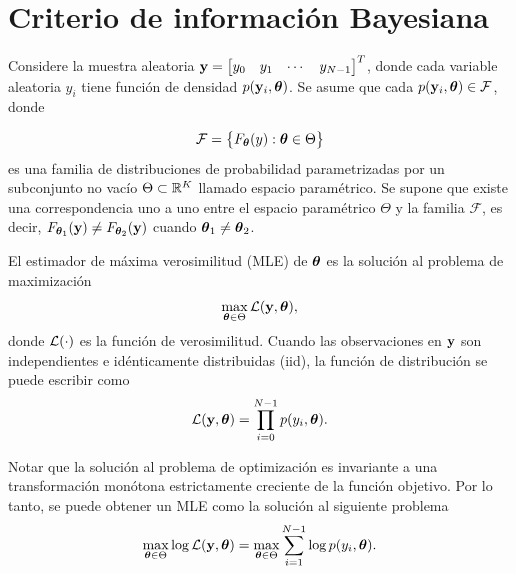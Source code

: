
\section{Criterio de información Bayesiana}\label{BIC_Appendix}


Considere la muestra aleatoria $\mathbf{y}=\begin{bmatrix} y_0 & y_1 & \cdots & y_{N-1}
\end{bmatrix}^T$, donde cada variable aleatoria $y_i$ tiene función de densidad $p(\mathbf{y}_i,\boldsymbol{\theta})$. Se asume que cada $p(\mathbf{y}_i,\boldsymbol{\theta})\in\mathcal{F}$, donde

\begin{equation}
	\mathcal{F} = \big\{F_{\boldsymbol{\theta}}(y):\boldsymbol{\theta}\in\Theta\big\}
	\label{eq:MLE0}
\end{equation}
es una familia de distribuciones de probabilidad parametrizadas por un  subconjunto no vacío $\Theta\subset\mathbb{R}^K$ llamado espacio paramétrico. Se supone que existe una correspondencia uno a uno entre el espacio paramétrico $\Theta$ y la familia $\mathcal{F}$, es decir, $F_{\boldsymbol{\theta}_1}(\mathbf{y})\neq F_{\boldsymbol{\theta}_2}(\mathbf{y})$ cuando $\boldsymbol{\theta}_1\neq\boldsymbol{\theta}_2$.

El estimador de máxima verosimilitud (MLE) de $\boldsymbol{\theta}$ es la solución al problema de maximización 
\begin{equation}
	\max_{\boldsymbol{\theta}\in\Theta}\mathcal{L}(\mathbf{y},\boldsymbol{\theta}),
	\label{eq:MLE1}
\end{equation}
donde $\mathcal{L}(\cdot)$ es la función de verosimilitud. Cuando las observaciones en $\mathbf{y}$ son independientes e idénticamente distribuidas (iid), la función de distribución se puede escribir como
\[\mathcal{L}(\mathbf{y},\boldsymbol{\theta}) = \prod_{i=0}^{N-1}p(y_i,\boldsymbol{\theta}).\]

Notar que la solución al problema de optimización es invariante a una transformación monótona estrictamente creciente de la función objetivo. Por lo tanto, se puede obtener un MLE como la solución al siguiente problema
\begin{equation}
	 \max_{\boldsymbol{\theta}\in\Theta}\log \mathcal{L}(\mathbf{y}, \boldsymbol{\theta}) = \max_{\boldsymbol{\theta}\in\Theta}\sum_{i=1}^{N-1}\log p(y_i,\boldsymbol{\theta}). 
	 \label{eq:MLE2}
\end{equation}

